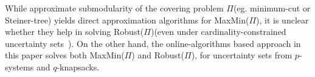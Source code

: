 \documentclass[11pt,letterpaper]{article}
\def\cov{\ensuremath{\Pi}\xspace}
\def\rcov{{\sf Robust(\cov)}\xspace}
\def\mmp{{\sf MaxMin(\cov)}\xspace}
\begin{document}
While approximate submodularity of the covering problem \cov  (eg. minimum-cut or Steiner-tree) yields direct
approximation algorithms for \mmp, it is unclear whether they help in solving \rcov (even under cardinality-constrained
uncertainty sets~\cite{GNR-k-rob}). On the other hand, the online-algorithms based approach in this paper solves both
\mmp and \rcov, for uncertainty sets from $p$-systems and $q$-knapsacks.




\end{document}
